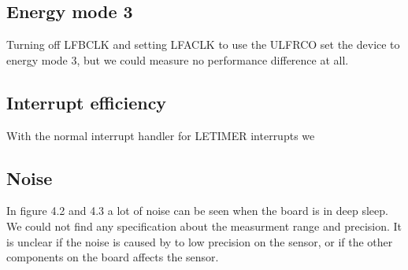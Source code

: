 \subsection{Energy mode 3}
Turning off LFBCLK and setting LFACLK to use the ULFRCO set the device to energy mode 3, but we could measure no performance difference at all.

\subsection{Interrupt efficiency}
With the normal interrupt handler for LETIMER interrupts we 

\subsection{Noise}
In figure 4.2 and 4.3 a lot of noise can be seen when the board is in deep sleep. We could not find any specification about the measurment range and precision. It is unclear if the noise is caused by to low precision on the sensor, or if the other components on the board affects the sensor.